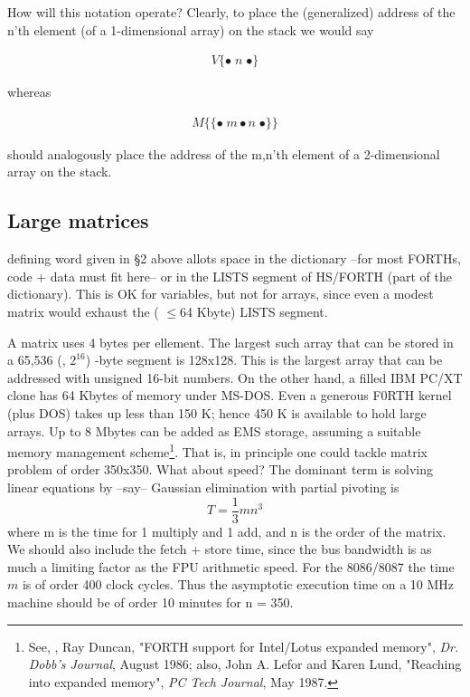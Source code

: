 How will this notation operate? Clearly, to place the (generalized) address of the n'th element (of a 1-dimensional array) on the stack we would say

\begin{align*}
    V\{\bullet \;n \;\bullet\}
\end{align*}

whereas

\begin{align*}
    M\{\{ \bullet \;m \bullet n \;\bullet\}\}
\end{align*}

should analogously place the address of the m,n'th element of a 2-dimensional array on the stack.

\subsection{Large matrices}
 defining word  given in \S2 above allots space in the dictionary --for most FORTHs, code + data must fit here-- or in the LISTS segment of HS/FORTH (part of the dictionary). This is OK for variables, but not for arrays, since even a modest matrix would exhaust the ( $\leq$64 Kbyte) LISTS segment.

A  matrix uses 4 bytes per ellement. The largest such array that can be stored in a 65,536 (\ie, $2^{16}$) -byte segment is 128x128. This is the largest array that can be addressed with unsigned 16-bit numbers. On the other hand, a filled IBM PC/XT clone has 64 Kbytes of memory under MS-DOS. Even a generous F0RTH kernel (plus DOS) takes up less than 150 K; hence 450 K is available to hold large arrays. Up to 8 Mbytes can be added as EMS storage, assuming a suitable memory management scheme\footnote{See, \eg, Ray Duncan, "FORTH support for Intel/Lotus expanded memory", \textit{Dr. Dobb's Journal}, August 1986; also, John A. Lefor and Karen Lund, "Reaching into expanded memory", \textit{PC Tech Journal}, May 1987.}. That is, in principle one could tackle matrix problem of order 350x350. What about speed? The dominant term is solving linear equations by --say-- Gaussian elimination with partial pivoting is
\[
T = \frac{1}{3} mn^{3}
\]
where m is the time for 1 multiply and 1 add, and n is the order of the matrix. We should also include the fetch + store time, since the bus bandwidth is as much a limiting factor as the FPU arithmetic speed. For the 8086/8087 the time $m$ is of order 400 clock cycles. Thus the asymptotic execution time on a 10 MHz machine should be of order 10 minutes for n = 350.

